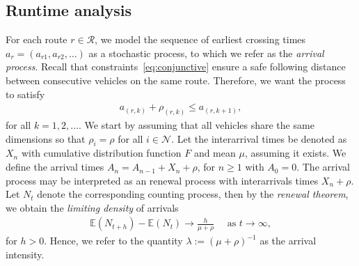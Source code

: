 \documentclass[a4paper]{article}
\theoremstyle{definition}
\theoremstyle{plain}
\begin{document}
\subsection{Runtime analysis}

For each route $r \in \mathcal{R}$, we model the sequence of earliest crossing times
$a_{r} = (a_{r1}, a_{r2}, \dots)$ as a stochastic process, to which we refer as
the \textit{arrival process}. Recall that constraints~\eqref{eq:conjunctive}
ensure a safe following distance between consecutive vehicles on the same route.
Therefore, we want the process to satisfy
\begin{align*}
  a_{(r, k)} + \rho_{(r,k)} \leq a_{(r, k + 1)} ,
\end{align*}
for all $k = 1, 2, \dots$. We start by assuming that all vehicles share the same
dimensions so that $\rho_{i} = \rho$ for all $i \in \mathcal{N}$.
%
Let the interarrival times be denoted as $X_{n}$ with cumulative distribution
function $F$ and mean $\mu$, assuming it exists. We define the arrival times $A_{n} = A_{n-1} + X_{n} + \rho$, for $n \geq 1$
with $A_{0} = 0$.
%
The arrival process may be interpreted as an renewal process with interarrivals
times $X_{n} + \rho$.
%
%
Let $N_{t}$ denote the corresponding counting process, then by the \textit{renewal
  theorem}, we obtain the \textit{limiting density} of arrivals
%
\begin{align*}
  \mathbb{E}(N_{t + h}) - \mathbb{E}(N_{t}) \rightarrow \frac{h}{\mu + \rho} \quad \text{ as } t \rightarrow \infty ,
\end{align*}
for $h > 0$. Hence, we refer to the quantity $\lambda := {(\mu + \rho)}^{-1}$ as the
arrival intensity.

%
%
\end{document}
